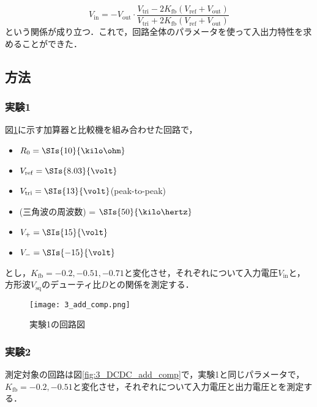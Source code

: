 \documentclass[1_power_supply.tex]{subfiles}
\begin{document}
      \begin{equation}
        V_\mathrm{in} = - V_\mathrm{out} \cdot\frac{V_\mathrm{tri}-2K_\mathrm{fb}(V_\mathrm{ref}+V_\mathrm{out})}{V_\mathrm{tri}+2K_\mathrm{fb}(V_\mathrm{ref}+V_\mathrm{out})} \label{eq:3_DCDC_add_comp}
      \end{equation}
      という関係が成り立つ．これで，回路全体のパラメータを使って入出力特性を求めることができた．

  \subsection{方法}

    \subsubsection{実験1}

      図\ref{fig:3_add_comp_circ}に示す加算器と比較機を組み合わせた回路で，
      \begin{itemize}
        \item $R_0 = \SIs{10}{\kilo\ohm}$
        \item $V_\mathrm{ref} = \SIs{8.03}{\volt}$
        \item $V_\mathrm{tri} = \SIs{13}{\volt}$(peak-to-peak)
        \item (三角波の周波数) = $\SIs{50}{\kilo\hertz}$
        \item $V_+ = \SIs{15}{\volt}$
        \item $V_- = \SIs{-15}{\volt}$
      \end{itemize}
      とし，$K_\mathrm{fb} = -0.2, -0.51, -0.71$と変化させ，それぞれについて入力電圧$V_\mathrm{in}$と，方形波$V_\mathrm{sq}$のデューティ比$D$との関係を測定する．


      \begin{figure}[htbp]
        \begin{center}
          \texttt{[image: 3\_add\_comp.png]}
          \caption{実験1の回路図}\label{fig:3_add_comp_circ}
        \end{center}
      \end{figure}

    \subsubsection{実験2}

      測定対象の回路は図\ref{fig:3_DCDC_add_comp}で，実験1と同じパラメータで，$K_\mathrm{fb} = -0.2,-0.51$と変化させ，それぞれについて入力電圧と出力電圧とを測定する．
\end{document}
